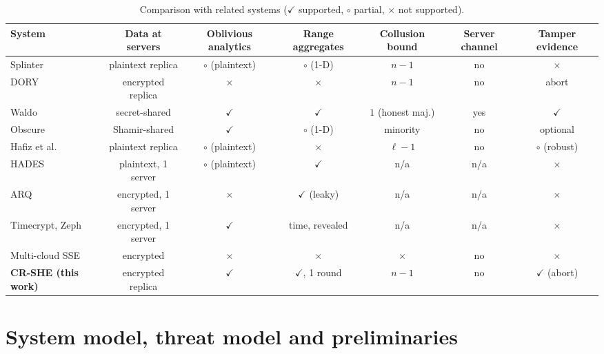 \begin{table}[pos=t,width=\textwidth]
\caption{Comparison with related systems ($\checkmark$ supported, $\circ$
partial, $\times$ not supported).}
\label{tab:compare}
\centering
\scriptsize
\setlength{\tabcolsep}{3pt}
\begin{tabular*}{\tblwidth}{@{\extracolsep{\fill}}lcccccc@{}}
\toprule
System & Data at servers & Oblivious analytics & Range aggregates &
Collusion bound & Server channel & Tamper evidence \\
\midrule
Splinter \citep{splinter} & plaintext replica & $\circ$ (plaintext) & $\circ$ (1-D) & $n-1$ & no & $\times$ \\
DORY \citep{dory} & encrypted replica & $\times$ & $\times$ & $n-1$ & no & abort \\
Waldo \citep{waldo} & secret-shared & $\checkmark$ & $\checkmark$ & $1$ (honest maj.) & yes & $\checkmark$ \\
Obscure \citep{gupta2020obscure} & Shamir-shared & $\checkmark$ & $\circ$ (1-D) & minority & no & optional \\
Hafiz et al.\ \citep{hafiz2024private} & plaintext replica & $\circ$ (plaintext) & $\times$ & $\ell-1$ & no & $\circ$ (robust) \\
HADES \citep{liu2025hades} & plaintext, 1 server & $\circ$ (plaintext) & $\checkmark$ & n/a & n/a & $\times$ \\
ARQ \citep{espiritu2022arq} & encrypted, 1 server & $\times$ & $\checkmark$ (leaky) & n/a & n/a & $\times$ \\
Timecrypt, Zeph \citep{timecrypt,zeph} & encrypted, 1 server & $\checkmark$ & time, revealed & n/a & n/a & $\times$ \\
Multi-cloud SSE \citep{xu2021privacy} & encrypted & $\times$ & $\times$ & $\times$ & no & $\times$ \\
\midrule
\textbf{CR-SHE (this work)} & encrypted replica & $\checkmark$ & $\checkmark$, 1 round & $n-1$ & no & $\checkmark$ (abort) \\
\bottomrule
\end{tabular*}
\end{table}

\section{System model, threat model and preliminaries}
\label{sec:system}

